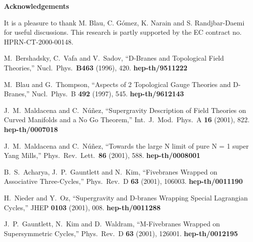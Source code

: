 \documentclass[12pt,a4paper]{article}
\begin{document}

   
\vspace{8 mm}
  

{\bf Acknowledgements}

It is a pleasure to thank M. Blau, C. G\'omez, K. Narain and S. Randjbar-Daemi 
for useful discussions. This research is partly supported by the EC contract no. HPRN-CT-2000-00148.

\newpage





\begin{thebibliography}{99}

\renewcommand{\baselinestretch}{1}
\normalsize

 M.~Bershadsky, C.~Vafa and V.~Sadov,
``D-Branes and Topological Field Theories,''
Nucl.\ Phys.\ {\bf B463} (1996), 420. {\bf hep-th/9511222}

 M.~Blau and G.~Thompson,
``Aspects of \coordHE{}  \myHighlight{$\geq$}\coordHE{} 2 Topological Gauge Theories and D-Branes,''
Nucl.\ Phys.\ B {\bf 492} (1997), 545. {\bf hep-th/9612143}

 J.~M.~Maldacena and C.~N\'u\~nez,
``Supergravity Description of Field Theories on Curved Manifolds and a No Go Theorem,''
Int.\ J.\ Mod.\ Phys.\ A {\bf 16} (2001), 822. {\bf hep-th/0007018}

 J.~M.~Maldacena and C.~N\'u\~nez,
``Towards the large N limit of pure N = 1 super Yang Mills,''
Phys.\ Rev.\ Lett.\ {\bf 86} (2001), 588. {\bf hep-th/0008001}

 B.~S.~Acharya, J.~P.~Gauntlett and N.~Kim,
``Fivebranes Wrapped on Associative Three-Cycles,''
Phys.\ Rev.\ D {\bf 63} (2001), 106003. {\bf hep-th/0011190}

 H.~Nieder and Y.~Oz,
``Supergravity and D-branes Wrapping Special Lagrangian Cycles,''
JHEP {\bf 0103} (2001), 008. {\bf hep-th/0011288}

 J.~P.~Gauntlett, N.~Kim and D.~Waldram,
``M-Fivebranes Wrapped on Supersymmetric Cycles,''
Phys.\ Rev.\ D {\bf 63} (2001), 126001. {\bf hep-th/0012195}


\end{thebibliography}
\end{document}
